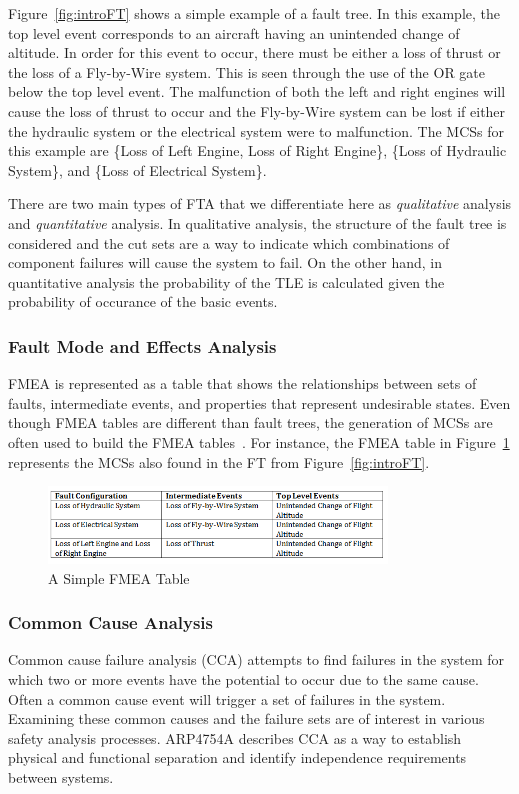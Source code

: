 Figure~\ref{fig:introFT} shows a simple example of a fault tree. In this example, the top level event corresponds to an aircraft having an unintended change of altitude. In order for this event to occur, there must be either a loss of thrust or the loss of a Fly-by-Wire system. This is seen through the use of the OR gate below the top level event. The malfunction of both the left and right engines will cause the loss of thrust to occur and the Fly-by-Wire system can be lost if either the hydraulic system or the electrical system were to malfunction. The MCSs for this example are \{Loss of Left Engine, Loss of Right Engine\}, \{Loss of Hydraulic System\}, and \{Loss of Electrical System\}. 

There are two main types of FTA that we differentiate here as \textit{qualitative} analysis and \textit{quantitative} analysis. In qualitative analysis, the structure of the fault tree is considered and the cut sets are a way to indicate which combinations of component failures will cause the system to fail. On the other hand, in quantitative analysis the probability of the TLE is calculated given the probability of occurance of the basic events. 


\subsubsection{Fault Mode and Effects Analysis}
FMEA is represented as a table that shows the relationships between sets of faults, intermediate events, and properties that represent undesirable states. Even though FMEA tables are different than fault trees, the generation of MCSs are often used to build the FMEA tables~\cite{Bozzano:2010:DSA:1951720}. For instance, the FMEA table in Figure~\ref{fig:introFMEA} represents the MCSs also found in the FT from Figure~\ref{fig:introFT}.

\begin{figure}[h]
\begin{center}
\includegraphics[width=9cm]{images/fmea.png}
\caption{A Simple FMEA Table} \label{fig:introFMEA}
\end{center}
\end{figure}

\subsubsection{Common Cause Analysis}
Common cause failure analysis (CCA) attempts to find failures in the system for which two or more events have the potential to occur due to the same cause. Often a common cause event will trigger a set of failures in the system. Examining these common causes and the failure sets are of interest in various safety analysis processes. ARP4754A describes CCA as a way to establish physical and functional separation and identify independence requirements between systems. 


